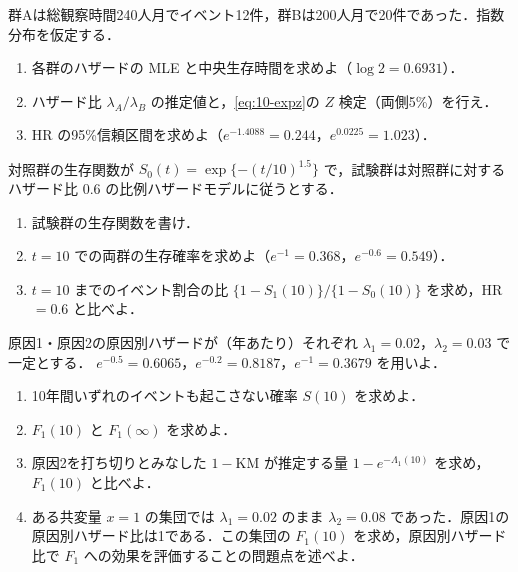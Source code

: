 \begin{reidai}\label{reidai:10-2}
群Aは総観察時間240人月でイベント12件，群Bは200人月で20件であった．指数分布を仮定する．
\begin{enumerate}[label=(\arabic*)]
\item 各群のハザードの MLE と中央生存時間を求めよ（$\log2=0.6931$）．
\item ハザード比 $\lambda_A/\lambda_B$ の推定値と，\cref{eq:10-expz}の $Z$ 検定（両側5\%）を行え．
\item HR の95\%信頼区間を求めよ（$e^{-1.4088}=0.244$，$e^{0.0225}=1.023$）．
\end{enumerate}
\end{reidai}

\begin{reidai}[比例ハザードの下での生存関数]\label{reidai:10-3}
対照群の生存関数が $S_0(t)=\exp\{-(t/10)^{1.5}\}$ で，試験群は対照群に対するハザード比 $0.6$ の比例ハザードモデルに従うとする．
\begin{enumerate}[label=(\arabic*)]
\item 試験群の生存関数を書け．
\item $t=10$ での両群の生存確率を求めよ（$e^{-1}=0.368$，$e^{-0.6}=0.549$）．
\item $t=10$ までのイベント割合の比 $\{1-S_1(10)\}/\{1-S_0(10)\}$ を求め，HR $=0.6$ と比べよ．
\end{enumerate}
\end{reidai}

\begin{reidai}\label{reidai:10-4}
原因1・原因2の原因別ハザードが（年あたり）それぞれ $\lambda_1=0.02$，$\lambda_2=0.03$ で一定とする．
$e^{-0.5}=0.6065$，$e^{-0.2}=0.8187$，$e^{-1}=0.3679$ を用いよ．
\begin{enumerate}[label=(\arabic*)]
\item 10年間いずれのイベントも起こさない確率 $S(10)$ を求めよ．
\item $F_1(10)$ と $F_1(\infty)$ を求めよ．
\item 原因2を打ち切りとみなした $1-\mathrm{KM}$ が推定する量 $1-e^{-\Lambda_1(10)}$ を求め，$F_1(10)$ と比べよ．
\item ある共変量 $x=1$ の集団では $\lambda_1=0.02$ のまま $\lambda_2=0.08$ であった．原因1の原因別ハザード比は1である．この集団の $F_1(10)$ を求め，原因別ハザード比で $F_1$ への効果を評価することの問題点を述べよ．
\end{enumerate}
\end{reidai}

